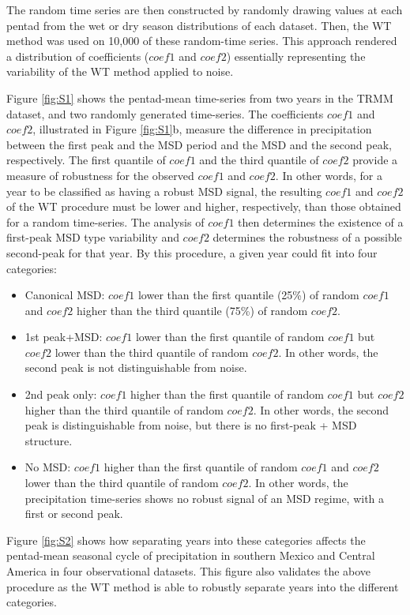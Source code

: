  The random time series are then constructed by randomly drawing values at each pentad  from the wet or dry season distributions of each dataset.
 Then, the WT method was used on 10,000 of these random-time series. This approach rendered a distribution of coefficients ($coef1$ and $coef2$) essentially representing the variability of the WT method applied to noise.
 
  Figure \ref{fig:S1} shows the pentad-mean time-series from two years in the TRMM dataset, and two randomly generated time-series.
The coefficients $coef1$ and $coef2$, illustrated in Figure \ref{fig:S1}b, measure the difference in precipitation between the first peak and the MSD period and the MSD and the second peak, respectively. The first quantile of $coef1$ and the third quantile of $coef2$ provide a measure of robustness for the observed $coef1$ and $coef2$. In other words, for a year to be classified as having a robust MSD signal, the resulting $coef1$ and $coef2$ of the WT procedure must be lower and higher, respectively, than those obtained for a random time-series.
The analysis of $coef1$ then determines the existence of a first-peak MSD type variability and $coef2$ determines the robustness of a possible second-peak for that year.
By this procedure, a given year could fit into four categories:

\begin{itemize}
\item Canonical MSD: $coef1$ lower than the first quantile (25\%) of random $coef1$ and $coef2$ higher than the third quantile (75\%) of random $coef2$.
\item 1st peak+MSD: $coef1$ lower than the first quantile of random $coef1$ but $coef2$ lower than the third quantile of random $coef2$. In other words, the second peak is not distinguishable from noise.
\item 2nd peak only: $coef1$ higher than the first quantile of random $coef1$ but $coef2$ higher than the third quantile of random $coef2$. In other words, the second peak is distinguishable from noise, but there is no first-peak + MSD structure.
\item No MSD: $coef1$ higher than the first quantile of random $coef1$ and $coef2$ lower than the third quantile of random $coef2$. In other words, the precipitation time-series shows no robust signal of an MSD regime, with a first or second peak.
\end{itemize}
 
 Figure \ref{fig:S2} shows how separating years into these categories affects the pentad-mean seasonal cycle of precipitation in southern Mexico and Central America in four observational datasets. This figure also validates the above procedure as the WT method is able to robustly separate years into the different categories. 


